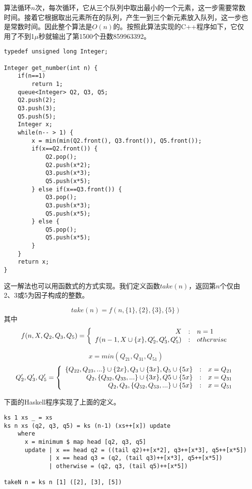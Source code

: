 \documentclass[UTF8]{article}
\begin{document}
算法循环$n$次，每次循环，它从三个队列中取出最小的一个元素，这一步需要常数时间。接着它根据取出元素所在的队列，产生一到三个新元素放入队列，这一步也是常数时间。因此整个算法是$O(n)$的。按照此算法实现的C++程序如下，它仅用了不到1$\mu$秒就输出了第1500个丑数859963392。

\lstset{language=C++}
\begin{lstlisting}
typedef unsigned long Integer;

Integer get_number(int n) {
    if(n==1)
        return 1;
    queue<Integer> Q2, Q3, Q5;
    Q2.push(2);
    Q3.push(3);
    Q5.push(5);
    Integer x;
    while(n-- > 1) {
        x = min(min(Q2.front(), Q3.front()), Q5.front());
        if(x==Q2.front()) {
            Q2.pop();
            Q2.push(x*2);
            Q3.push(x*3);
            Q5.push(x*5);
        } else if(x==Q3.front()) {
            Q3.pop();
            Q3.push(x*3);
            Q5.push(x*5);
        } else {
            Q5.pop();
            Q5.push(x*5);
        }
    }
    return x;
}
\end{lstlisting}

这一解法也可以用函数式的方式实现。我们定义函数$take(n)$，返回第$n$个仅由2、3或5为因子构成的整数。

\[
  take(n) = f(n, \{1\}, \{2\}, \{3\}, \{5\})
\]
其中
\[
 f(n, X, Q_2, Q_3, Q_5) = \left \{
  \begin{array}{r@{\quad:\quad}l}
  X & n = 1 \\
  f(n-1, X \cup \{x\}, Q_2', Q_3', Q_5') & otherwise
  \end{array}
\right.
\]

\[
 x = min(Q_{21}, Q_{31}, Q_{51})
\]
\[
 Q_2', Q_3', Q_5' = \left \{
 \begin{array}{r@{\quad:\quad}l}
 \{Q_{22}, Q_{23}, ...\} \cup \{2x\}, Q_3 \cup \{3x\}, Q_5 \cup \{5x\} & x = Q_{21} \\
 Q_2, \{Q_{32}, Q_{33}, ...\} \cup \{3x\}, Q5 \cup \{5x\} & x = Q_{31} \\
 Q_2, Q_3, \{Q_{52}, Q_{53}, ...\} \cup \{5x\} & x = Q_{51}
 \end{array}
 \right.
\]

下面的Haskell程序实现了上面的定义。

\begin{lstlisting}[style=Haskell]
ks 1 xs _ = xs
ks n xs (q2, q3, q5) = ks (n-1) (xs++[x]) update
    where
      x = minimum $ map head [q2, q3, q5]
      update | x == head q2 = ((tail q2)++[x*2], q3++[x*3], q5++[x*5])
             | x == head q3 = (q2, (tail q3)++[x*3], q5++[x*5])
             | otherwise = (q2, q3, (tail q5)++[x*5])

takeN n = ks n [1] ([2], [3], [5])
\end{lstlisting} %
\end{document}
